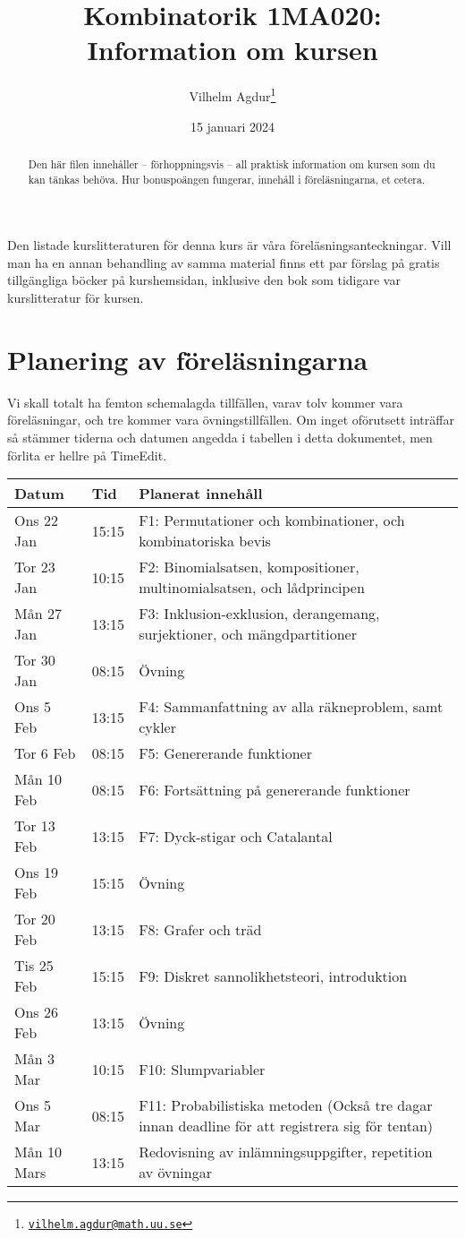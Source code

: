 \documentclass[nobib]{tufte-handout}
\title{Kombinatorik 1MA020: Information om kursen}
\author[Vilhelm Agdur]{Vilhelm Agdur\thanks{\href{mailto:vilhelm.agdur@math.uu.se}{\nolinkurl{vilhelm.agdur@math.uu.se}}}}
\date{15 januari 2024}
\begin{document}
\maketitle%

\begin{abstract}
\noindent
Den här filen innehåller -- förhoppningsvis -- all praktisk information om kursen som du kan tänkas behöva. Hur bonuspoängen fungerar, innehåll
i föreläsningarna, et cetera. 
\end{abstract}

Den listade kurslitteraturen för denna kurs är våra föreläsningsanteckningar. Vill man ha en annan behandling av samma material finns ett par förslag på gratis tillgängliga böcker på kurshemsidan, inklusive den bok som tidigare var kurslitteratur för kursen.

\section{Planering av föreläsningarna}

Vi skall totalt ha femton schemalagda tillfällen, varav tolv kommer vara föreläsningar, och tre kommer vara övningstillfällen. Om inget oförutsett inträffar så stämmer tiderna och datumen angedda i tabellen i detta dokumentet, men förlita er hellre på TimeEdit.

\begin{table}[h]
\begin{tabularx}{\textwidth}{llX}
Datum & Tid      & Planerat innehåll \\ 
\midrule
Ons 22 Jan &15:15 & F1: Permutationer och kombinationer, och kombinatoriska bevis\\
Tor 23 Jan &10:15 & F2: Binomialsatsen, kompositioner, multinomialsatsen, och lådprincipen\\
Mån 27 Jan &13:15 & F3: Inklusion-exklusion, derangemang, surjektioner, och mängdpartitioner\\
Tor 30 Jan &08:15 & Övning\\
Ons 5 Feb &13:15 & F4: Sammanfattning av alla räkneproblem, samt cykler\\
Tor 6 Feb &08:15 & F5: Genererande funktioner\\
Mån 10 Feb &08:15 & F6: Fortsättning på genererande funktioner\\
Tor 13 Feb &13:15 & F7: Dyck-stigar och Catalantal\\
Ons 19 Feb &15:15 & Övning\\
Tor 20 Feb &13:15 & F8: Grafer och träd\\
Tis 25 Feb &15:15 & F9: Diskret sannolikhetsteori, introduktion\\
Ons 26 Feb &13:15 & Övning\\
Mån 3 Mar &10:15 & F10: Slumpvariabler\\
Ons 5 Mar &08:15 & F11: Probabilistiska metoden (Också tre dagar innan deadline för att registrera sig för tentan)\\
Mån 10 Mars &13:15 & Redovisning av inlämningsuppgifter, repetition av övningar
\end{tabularx}
\end{table}
\end{document}
